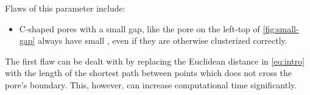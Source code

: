 \documentclass[reprint,amsmath,amssymb,aps,pre,showkeys,showpacs]{revtex4-1}
\newcommand{\highlight}[1]{{\color{red}{#1}}} %
\begin{document}
Flaws of this parameter include:
\begin{itemize}
\item C-shaped pores with a small gap, like the pore on the left-top of
  \cref{fig:small-gap} always have small \highlight{awesomeness}, even if they
  are otherwise clusterized correctly.
\end{itemize}

The first flaw can be dealt with by replacing the Euclidean distance in
\cref{eq:intro} with the length of the shortest path between points which does
not cross the pore's boundary. This, however, can increase computational time
significantly.


\end{document}
